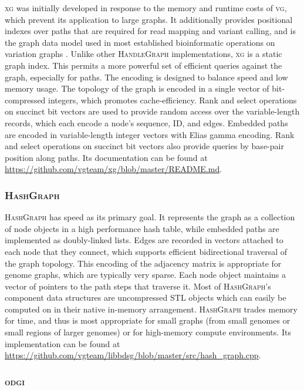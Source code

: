 \documentclass{article}
\begin{document}
\textsc{xg} was initially developed in response to the memory and runtime costs of \textsc{vg}, which prevent its application to large graphs.
It additionally provides positional indexes over paths that are required for read mapping and variant calling, and is the graph data model used in most established bioinformatic operations on variation graphs \cite{Garrison_2018,hickey2020genotyping}.
Unlike other \textsc{HandleGraph} implementations, \textsc{xg} is a static graph index.
This permits a more powerful set of efficient queries against the graph, especially for paths.
The encoding is designed to balance speed and low memory usage.
The topology of the graph is encoded in a single vector of bit-compressed integers, which promotes cache-efficiency.
Rank and select operations on succinct bit vectors are used to provide random access over the variable-length records, which each encode a node's sequence, ID, and edges.
Embedded paths are encoded in variable-length integer vectors with Elias gamma encoding.
Rank and select operations on succinct bit vectors also provide queries by base-pair position along paths.
Its documentation can be found at \url{https://github.com/vgteam/xg/blob/master/README.md}.

\subsubsection{\textsc{HashGraph}}

\textsc{HashGraph} has speed as its primary goal.
It represents the graph as a collection of node objects in a high performance hash table, while embedded paths are implemented as doubly-linked lists.
Edges are recorded in vectors attached to each node that they connect, which supports efficient bidirectional traversal of the graph topology.
This encoding of the adjacency matrix is appropriate for genome graphs, which are typically very sparse.
Each node object maintains a vector of pointers to the path steps that traverse it.
Most of \textsc{HashGraph}'s component data structures are uncompressed STL objects which can easily be computed on in their native in-memory arrangement.
\textsc{HashGraph} trades memory for time, and thus is most appropriate for small graphs (from small genomes or small regions of larger genomes) or for high-memory compute environments.
Its implementation can be found at \url{https://github.com/vgteam/libbdsg/blob/master/src/hash_graph.cpp}.

\subsubsection{\textsc{odgi}}
\end{document}
